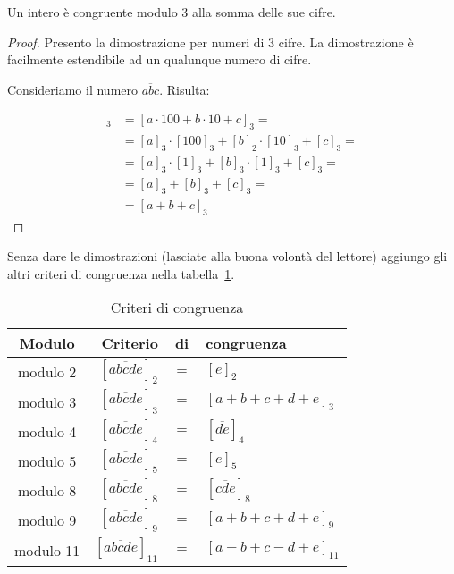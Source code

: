 \begin{mdframed}
    \begin{teorema}
        Un intero è congruente modulo 3 alla somma delle sue cifre.
    \end{teorema}
    \begin{proof}
        Presento la dimostrazione per numeri di 3 cifre. La dimostrazione è facilmente estendibile ad un qualunque numero di cifre.

        Consideriamo il numero $\overline{abc}$. Risulta:

        \begin{align*}
            [\overline{abc}]_3 &= [a \cdot 100 + b \cdot 10 + c]_3 = \\
            &= [a]_3 \cdot [100]_3 + [b]_2 \cdot [10]_3 + [c]_3 = \\
            &= [a]_3 \cdot [1]_3 + [b]_3 \cdot [1]_3 + [c]_3 = \\
            &= [a]_3 + [b]_3 + [c]_3 = \\
            &= [a + b + c]_3
        \end{align*}
    \end{proof}
\end{mdframed}

Senza dare le dimostrazioni (lasciate alla buona volontà del lettore) aggiungo gli altri criteri di congruenza nella tabella~\ref{tab:criteri_congruenza}.

\begin{table}[tp]
    \begin{mdframed}    
        \label{tab:criteri_congruenza}
        \centering
        \begin{tabular}{c|rcl}
            \toprule
            Modulo & Criterio & di & congruenza \\
            \midrule
            modulo 2 & $[\overline{abcde}]_2 $ & $ = $ & $ [e]_2$ \\
            modulo 3 & $[\overline{abcde}]_3 $ & $ = $ & $ [a + b + c + d + e]_3$ \\
            modulo 4 & $[\overline{abcde}]_4 $ & $ = $ & $ [\overline{de}]_4$ \\
            modulo 5 & $[\overline{abcde}]_5 $ & $ = $ & $ [e]_5$ \\
            modulo 8 & $[\overline{abcde}]_8 $ & $ = $ & $ [\overline{cde}]_8$ \\
            modulo 9 & $[\overline{abcde}]_9 $ & $ = $ & $ [a + b + c + d + e]_9$ \\
            modulo 11 & $[\overline{abcde}]_{11} $ & $ = $ & $ [a - b + c - d + e]_{11}$ \\
            \bottomrule
        \end{tabular}
        \caption{Criteri di congruenza}
    \end{mdframed}
\end{table}

